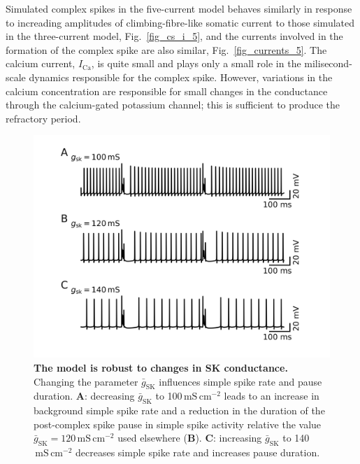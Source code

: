 \documentclass[twocolumn]{svjour3}          %
\newcommand{\msi}{\,\mathrm{mS\,cm^{-2}}}
\newcommand{\ca}{\mathrm{Ca}}
\newcommand{\sk}{\mathrm{SK}}
\begin{document}
Simulated complex spikes in the five-current model behaves similarly
in response to increading amplitudes of climbing-fibre-like somatic
current to those simulated in the three-current model,
Fig.~\ref{fig_cs_i_5}, and the currents involved in the formation of
the complex spike are also similar, Fig.~\ref{fig_currents_5}. The
calcium current, $I_\ca$, is quite small and plays only a small role
in the milisecond-scale dynamics responsible for the complex
spike. However, variations in the calcium concentration are
responsible for small changes in the conductance through the
calcium-gated potassium channel; this is sufficient to produce the
refractory period.

\begin{figure}[!ht]
  \includegraphics[width=\linewidth]{figure_gsk.jpg}
\caption{\textbf{The model is robust to changes in SK conductance.}
  Changing the parameter $\bar{g}_\sk$ influences simple spike rate
  and pause duration. \textbf{A}: decreasing $\bar{g}_\sk$ to
  100$\msi$ leads to an increase in background simple spike rate and a
  reduction in the duration of the post-complex spike pause in simple
  spike activity relative the value $\bar{g}_\sk=120\msi$ used elsewhere
  (\textbf{B}). \textbf{C}: increasing $\bar{g}_\sk$ to 140$\msi$
  decreases simple spike rate and increases pause duration.}
\label{fig_gsk}
\end{figure}
\end{document}
